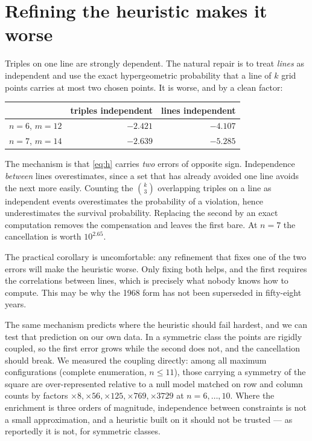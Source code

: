 \documentclass[11pt,a4paper]{article}
\begin{document}
\section{Refining the heuristic makes it worse}
Triples on one line are strongly dependent.  The natural repair is to treat \emph{lines} as
independent and use the exact hypergeometric probability that a line of $k$ grid points carries at
most two chosen points.  It is worse, and by a clean factor:
\begin{center}
\begin{tabular}{rrr}
\toprule
 & triples independent & lines independent \\
\midrule
$n=6$, $m=12$ & $-2.421$ & $-4.107$\\
$n=7$, $m=14$ & $-2.639$ & $-5.285$\\
\bottomrule
\end{tabular}
\end{center}
The mechanism is that \eqref{eq:h} carries \emph{two} errors of opposite sign.  Independence
\emph{between} lines overestimates, since a set that has already avoided one line avoids the next
more easily.  Counting the $\binom{k}{3}$ overlapping triples on a line as independent events
overestimates the probability of a violation, hence underestimates the survival probability.
Replacing the second by an exact computation removes the compensation and leaves the first bare.
At $n=7$ the cancellation is worth $10^{2.65}$.

The practical corollary is uncomfortable: any refinement that fixes one of the two errors will make
the heuristic worse.  Only fixing both helps, and the first requires the correlations between lines,
which is precisely what nobody knows how to compute.  This may be why the 1968 form has not been
superseded in fifty-eight years.

The same mechanism predicts where the heuristic should fail hardest, and we can test that
prediction on our own data.  In a symmetric class the points are rigidly coupled, so the first
error grows while the second does not, and the cancellation should break.  We measured the
coupling directly: among all maximum configurations (complete enumeration, $n\le11$), those
carrying a symmetry of the square are over-represented relative to a null model matched on row and
column counts by factors $\times8,\times56,\times125,\times769,\times3729$ at $n=6,\dots,10$.
Where the enrichment is three orders of magnitude, independence between constraints is not a
small approximation, and a heuristic built on it should not be trusted --- as reportedly it is
not, for symmetric classes.
\end{document}
